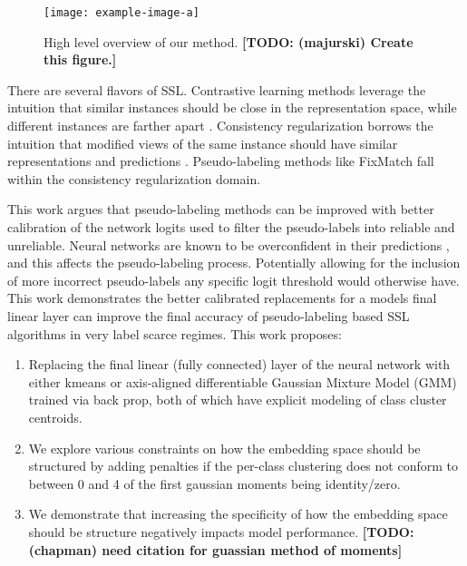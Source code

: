 \documentclass[10pt,twocolumn,letterpaper]{article}
\newcommand{\TODO}[1]{\textbf{\color{red}[TODO: #1]}}
\begin{document}
\begin{figure}[ht]
	\centering
	\texttt{[image: example-image-a]}
	\caption{High level overview of our method. \TODO {(majurski) Create this figure.}}
	\label{fig:schema}
\end{figure}

There are several flavors of SSL.
Contrastive learning methods leverage the intuition that similar instances should be close in the representation space, while different instances are farther apart \cite{yang2022class,li2021comatch}.
Consistency regularization borrows the intuition that modified views of the same instance should have similar representations and predictions \cite{sohn2020fixmatch,lee2022contrastive,zhang2021flexmatch,kim2022conmatch}.
Pseudo-labeling methods like FixMatch \cite{sohn2020fixmatch} fall within the consistency regularization domain.

This work argues that pseudo-labeling methods can be improved with better calibration of the network logits used to filter the pseudo-labels into reliable and unreliable. 
Neural networks are known to be overconfident in their predictions \cite{wei2022mitigating}, and this affects the pseudo-labeling process. 
Potentially allowing for the inclusion of more incorrect pseudo-labels any specific logit threshold would otherwise have.
This work demonstrates the better calibrated replacements for a models final linear layer can improve the final accuracy of pseudo-labeling based SSL algorithms in very label scarce regimes. 
This work proposes:

\begin{enumerate}
	\item Replacing the final linear (fully connected) layer of the neural network with either kmeans \cite{dwibedi2021little} or axis-aligned differentiable Gaussian Mixture Model (GMM) trained via back prop, both of which have explicit modeling of class cluster centroids. 
	\item We explore various constraints on how the embedding space should be structured by adding penalties if the per-class clustering does not conform to between 0 and 4 of the first gaussian moments being identity/zero.
	\item We demonstrate that increasing the specificity of how the embedding space should be structure negatively impacts model performance. \TODO {(chapman) need citation for guassian method of moments}
\end{enumerate}
\end{document}
